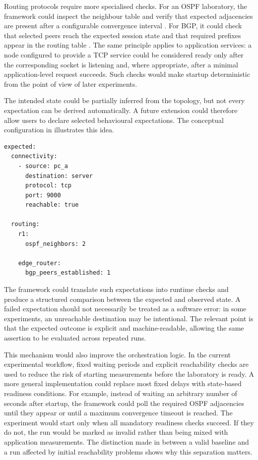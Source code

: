 Routing protocols require more specialised checks. For an OSPF laboratory, the
framework could inspect the neighbour table and verify that expected
adjacencies are present after a configurable convergence interval
\cite{rfc2328}. For BGP, it could check that selected peers reach the expected
session state and that required prefixes appear in the routing table
\cite{rfc4271,frr_user_guide}. The same principle applies to
application services: a node configured to provide a TCP service could be
considered ready only after the corresponding socket is listening and, where
appropriate, after a minimal application-level request succeeds. Such checks
would make startup deterministic from the point of view of later experiments.

The intended state could be partially inferred from the topology, but not every
expectation can be derived automatically. A future extension could therefore
allow users to declare selected behavioural expectations. The conceptual
configuration in  illustrates this idea.

\begin{lstlisting}[caption={Conceptual declaration of expected runtime properties.},label={lst:future-expected-state}]
expected:
  connectivity:
    - source: pc_a
      destination: server
      protocol: tcp
      port: 9000
      reachable: true

  routing:
    r1:
      ospf_neighbors: 2

    edge_router:
      bgp_peers_established: 1
\end{lstlisting}

The framework could translate such expectations into runtime checks and produce
a structured comparison between the expected and observed state. A failed
expectation should not necessarily be treated as a software error: in some
experiments, an unreachable destination may be intentional. The relevant point
is that the expected outcome is explicit and machine-readable, allowing the
same assertion to be evaluated across repeated runs.

This mechanism would also improve the orchestration logic. In the current
experimental workflow, fixed waiting periods and explicit reachability checks
are used to reduce the risk of starting measurements before the laboratory is
ready. A more general implementation could replace most fixed delays with
state-based readiness conditions. For example, instead of waiting an arbitrary
number of seconds after startup, the framework could poll the required OSPF
adjacencies until they appear or until a maximum convergence timeout is
reached. The experiment would start only when all mandatory readiness checks
succeed. If they do not, the run would be marked as invalid rather than being
mixed with application measurements. The distinction made in
 between a valid baseline and a run affected
by initial reachability problems shows why this separation matters.

